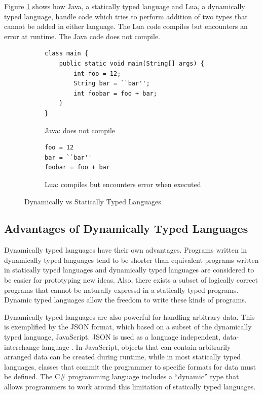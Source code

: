 \documentclass[english,a4paper,12pt]{report}
\begin{document}
Figure \ref{fig:dvs} shows how Java, a statically typed language
and Lua, a dynamically typed language, handle code which tries to
perform addition of two types that cannot be added in either
language. The Lua code compiles but encounters an error at
runtime. The Java code does not compile.

\begin{figure}
	\begin{subfigure}{.48\textwidth}
		\begin{lstlisting}[numbers=none,frame=none]
class main {
    public static void main(String[] args) {
        int foo = 12;
        String bar = ``bar'';
        int foobar = foo + bar;
    }
}
		\end{lstlisting}
		\caption{Java: does not compile}
	\end{subfigure}
	\begin{subfigure}{.48\textwidth}
		\begin{lstlisting}[numbers=none,frame=none]
foo = 12
bar = ``bar''
foobar = foo + bar
		\end{lstlisting}
		\caption{Lua: compiles but encounters error when executed}
	\end{subfigure}
	\caption{Dynamically vs Statically Typed Languages}
	\label{fig:dvs}
\end{figure}

\subsection{Advantages of Dynamically Typed Languages} 
Dynamically typed languages have their own advantages. Programs
written in dynamically typed languages tend to be shorter than
equivalent programs written in statically typed languages and
dynamically typed languages are considered to be easier for
prototyping new ideas. Also, there exists a subset of logically
correct programs that cannot be naturally expressd in a statically
typed programs. Dynamic typed languages allow the freedom to write
these kinds of programs.

Dynamically typed languages are also powerful for handling arbitrary
data. This is exemplified by the JSON format, which based on a subset
of the dynamically typed language, JavaScript. JSON is used as a
language independent, data-interchange language \cite{JSON}. In
JavaScript, objects that can contain arbitrarily arranged data can be
created during runtime, while in most statically typed languages,
classes that commit the programmer to specific formats for data must
be defined. The C\# programming language includes a ``dynamic'' type
\cite{dynamic} that allows programmers to work around this limitation
of statically typed languages.
\end{document}
